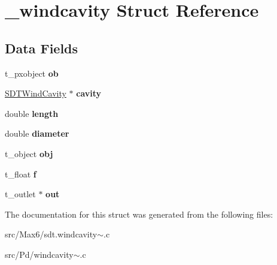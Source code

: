 \hypertarget{struct__windcavity}{}\section{\+\_\+windcavity Struct Reference}
\label{struct__windcavity}
\subsection*{Data Fields}
\begin{DoxyCompactItemize}
\item 
\hypertarget{struct__windcavity_a55b4380edb216f04a1c42b9095594963}{}t\+\_\+pxobject {\bfseries ob}\label{struct__windcavity_a55b4380edb216f04a1c42b9095594963}

\item 
\hypertarget{struct__windcavity_ad4372baba87d5ab66ae27878245a2a6e}{}\hyperlink{struct_s_d_t_wind_cavity}{S\+D\+T\+Wind\+Cavity} $\ast$ {\bfseries cavity}\label{struct__windcavity_ad4372baba87d5ab66ae27878245a2a6e}

\item 
\hypertarget{struct__windcavity_a928b11f5716331f0b89abe7d8d4124b4}{}double {\bfseries length}\label{struct__windcavity_a928b11f5716331f0b89abe7d8d4124b4}

\item 
\hypertarget{struct__windcavity_a2242a375bebbd1a1d1cf02a80d2715a2}{}double {\bfseries diameter}\label{struct__windcavity_a2242a375bebbd1a1d1cf02a80d2715a2}

\item 
\hypertarget{struct__windcavity_a21775ab6bc98b0961a6e9fd9d832e65b}{}t\+\_\+object {\bfseries obj}\label{struct__windcavity_a21775ab6bc98b0961a6e9fd9d832e65b}

\item 
\hypertarget{struct__windcavity_a73198eb29c82f0df575e45396b68c18c}{}t\+\_\+float {\bfseries f}\label{struct__windcavity_a73198eb29c82f0df575e45396b68c18c}

\item 
\hypertarget{struct__windcavity_a07b901a5d7d4140b7f701a94bf7f245c}{}t\+\_\+outlet $\ast$ {\bfseries out}\label{struct__windcavity_a07b901a5d7d4140b7f701a94bf7f245c}

\end{DoxyCompactItemize}


The documentation for this struct was generated from the following files\+:\begin{DoxyCompactItemize}
\item 
src/\+Max6/sdt.\+windcavity$\sim$.\+c\item 
src/\+Pd/windcavity$\sim$.\+c\end{DoxyCompactItemize}
